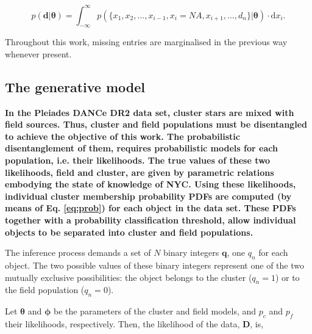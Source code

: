 \begin{equation}
\label{eq:marginalmiss}
p(\mathbf{d}|\boldsymbol{\theta})= \int_{-\infty}^{\infty} p(\{x_1,x_2,...,x_{i-1},x_{i}= NA,x_{i+1},...,d_n\}|\boldsymbol{\theta})\cdot \mathrm{d}x_{i}.
\end{equation}

Throughout this work, missing entries are marginalised in the previous way whenever present.


\subsection{The generative model}
\label{sect:generative-model}
\textbf{In the Pleiades DANCe DR2 data set, cluster stars are mixed with field sources. Thus, cluster and field populations must be disentangled to achieve the objective of this work. The probabilistic disentanglement of them, requires probabilistic models for each population, i.e. their likelihoods. The true values of these two likelihoods, field and cluster, are given by parametric relations embodying the state of knowledge of NYC.  Using these likelihoods, individual cluster membership probability PDFs are computed (by means of Eq. \ref{eq:prob}) for each object in the data set. These PDFs together with a probability classification threshold,  allow individual objects to be separated into cluster and field populations.}

The inference process demands a set of $N$ binary integers $\mathbf{q}$, one $q_n$ for each object. The two possible values of these binary integers represent one of the two mutually exclusive possibilities: the object belongs to the cluster ($q_n=1$) or to the field population ($q_n=0$). 

Let $\boldsymbol{\theta}$ and $\boldsymbol{\phi}$ be the parameters of the cluster and field models, and $p_c$ and $p_f$ their likelihoods, respectively. Then, the likelihood of the data, $\mathbf{D}$, is,

